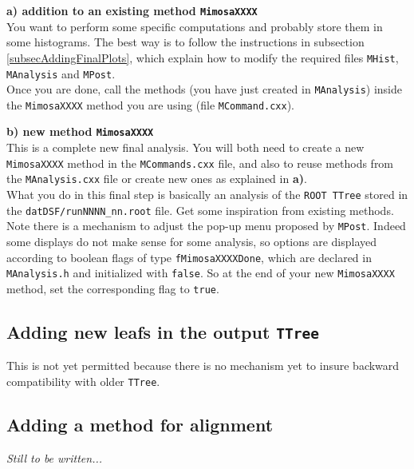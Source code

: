 \documentclass[a4paper, 12pt, twoside]{article}
\begin{document}
\vspace{.8 cm}

\noindent
{\bf a) addition to an existing method {\tt MimosaXXXX}}\\
\noindent
You want to perform some specific computations and probably store them in some histograms. The best way is to follow the instructions in subsection \ref{subsecAddingFinalPlots}, which explain how to modify the required files {\tt MHist}, {\tt MAnalysis} and {\tt MPost}.\\
Once you are done, call the methods (you have just created in {\tt MAnalysis}) inside the {\tt MimosaXXXX} method you are using (file {\tt MCommand.cxx}). 

\vspace{.8 cm}

\noindent
{\bf b) new method {\tt MimosaXXXX}}\\
\noindent
This is a complete new final analysis. You will both need to create a new {\tt MimosaXXXX} method in the {\tt MCommands.cxx} file, and also to reuse methods from the {\tt MAnalysis.cxx} file or create new ones as explained in {\bf a)}.\\ 
What you do in this final step is basically an analysis of the {\tt ROOT TTree} stored in the {\tt datDSF/runNNNN\_nn.root} file. Get some inspiration from existing methods.\\

\noindent
Note there is a mechanism to adjust the pop-up menu proposed by {\tt MPost}. Indeed some displays do not make sense for some analysis, so options are displayed according to boolean flags of type {\tt fMimosaXXXXDone}, which are declared in {\tt MAnalysis.h} and initialized with {\tt false}. So at the end of your new {\tt MimosaXXXX} method, set the corresponding flag to {\tt true}.


\subsection{Adding new leafs in the output {\tt TTree}}

\noindent
This is not yet permitted because there is no mechanism yet to insure backward compatibility with older {\tt TTree}.


\subsection{Adding a method for alignment}

{\it Still to be written...}
\end{document}
